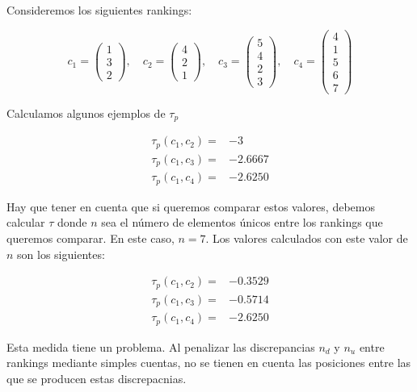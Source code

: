 \begin{ejemplo}
Consideremos los siguientes rankings:

\begin{equation*}
c_1 = \left( \begin{array}{c}
1\\
3\\
2
\end{array} \right), \quad
c_2 = \left( \begin{array}{c}
4\\
2\\
1
\end{array} \right), \quad
c_3 = \left( \begin{array}{c}
5\\
4\\
2\\
3
\end{array} \right), \quad
c_4 = \left( \begin{array}{c}
4\\
1\\
5\\
6\\
7
\end{array} \right)
\end{equation*}

Calculamos algunos ejemplos de $\tau_p$

\begin{align*}
\tau_p(c_1, c_2) = & -3\\
\tau_p(c_1, c_3) = & -2.6667\\
\tau_p(c_1, c_4) = & -2.6250
\end{align*}

Hay que tener en cuenta que si queremos comparar estos valores, debemos calcular $\tau$ donde $n$ sea el número de elementos únicos entre los rankings que queremos comparar. En este caso, $n=7$. Los valores calculados con este valor de $n$ son  los siguientes:

\begin{align*}
\tau_p(c_1, c_2) = & -0.3529\\
\tau_p(c_1, c_3) = & -0.5714\\
\tau_p(c_1, c_4) = & -2.6250
\end{align*}

\end{ejemplo}

Esta medida tiene un problema. Al penalizar las discrepancias $n_d$ y $n_u$ entre rankings mediante simples cuentas, no se tienen en cuenta las posiciones entre las que se producen estas discrepacnias.

